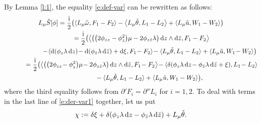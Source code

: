 \documentclass[10pt,a4paper]{amsart}
\numberwithin{equation}{section}
\begin{document}
By Lemma \ref{l:1}, the equality \eqref{e:def-var} can be rewritten as follows:
\begin{gather}
L_{\mu}\check{S}[\phi]
 =\frac{\rm i}{2}\bigl(\langle L_{\mu}\check{\omega}, F_1-F_2 \rangle-\big\langle L_{\mu}\check{\theta}, L_1-L_2 \big\rangle+\langle L_{\mu}\check{u}, W_1-W_2 \rangle\bigr)\nonumber
 \\ \hphantom{L_{\mu}\check{S}[\phi]}
{}=\frac{\rm i}{2}\bigl(\big\langle \big(\big(2\phi_{zz}-\phi^2_z\big)\mu -2\phi_{z\bar{z}} \lambda \big)\, {\rm d}z\wedge {\rm d}\bar{z}, F_1-F_2 \big\rangle \nonumber
\\ \hphantom{L_{\mu}\check{S}[\phi]=\frac{\rm i}{2}\bigl(}
{} -\!\langle {\rm d}(\phi_z \lambda \,{\rm d}z)\! - {\rm d}(\phi_{\bar{z}} \lambda\, {\rm d}\bar{z})+ {\rm d}\xi, F_1\!-F_2 \rangle\! -\langle L_{\mu}\check{\theta}, L_1-L_2 \rangle +\langle L_{\mu}\check{u}, W_1\!-W_2 \rangle\bigr)\nonumber
\\ \hphantom{L_{\mu}\check{S}[\phi]}
{}=\frac{\rm i}{2}\bigl(\big\langle\big(\big(2\phi_{zz}\!-\phi^2_z\big)\mu \!-2\phi_{z\bar{z}} \lambda \big)\, {\rm d}z\wedge {\rm d}\bar{z}, F_1\!-F_2 \big\rangle \!-\langle \delta(\phi_z \lambda \,{\rm d}z\!- \phi_{\bar{z}} \lambda\, {\rm d}\bar{z} + \xi), L_1\!-L_2 \rangle\nonumber
\\ \hphantom{L_{\mu}\check{S}[\phi]=\frac{\rm i}{2}\bigl(}
{} -\langle L_{\mu}\check{\theta}, L_1-L_2 \rangle+\langle L_{\mu}\check{u}, W_1-W_2 \rangle\bigr),
\label{e:der-var1}
\end{gather}
where the third equality follows from $\partial' F_i=\partial'' L_i$ for $i=1,2$.
To deal with terms in the last line of \eqref{e:der-var1} together, let us put
\begin{gather}\label{e:def-chi}
{\chi}:= \delta\xi + \delta(\phi_z \lambda \,{\rm d}z - \phi_{\bar{z}} \lambda\, {\rm d}\bar{z}) + L_{\mu} \check{\theta}.
\end{gather}
\end{document}
